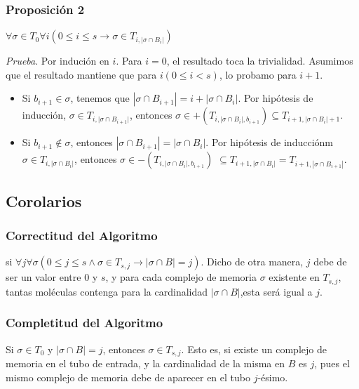 \documentclass[12pt, letterpaper, twoside]{article}
\begin{document}
    \subsubsection{Proposición 2}
    $\forall\sigma\in{T_0}\forall{i}(0\leq{i}\leq{s}\rightarrow\sigma\in{T_{i,|\sigma\cap{B_i}|}})$


    \emph{Prueba}. Por indución en $i$. Para $i=0$, el resultado toca la trivialidad. Asumimos que el resultado mantiene que para $i(0\leq{i}<s)$, lo probamo para $i+1$.
    \begin{itemize}
        \item Si $b_{i+1}\in\sigma$, tenemos que $|\sigma\cap{B_{i+1}}|=i + |\sigma\cap{B_i}|$. Por hipótesis de inducción, $\sigma\in{T_{i,|\sigma\cap{B_{i+1}|}}}$, entonces $\sigma\in{+(T_{i,|\sigma\cap{B_i}|,b_{i+1}})}\subseteq{T_{i+1,|\sigma\cap{B_i}|+1}}$.
        \item Si $b_{i+1}\notin\sigma$, entonces $|\sigma\cap{B_{i+1}}|=|\sigma\cap{B_i}|$. Por hipótesis de inducciónm $\sigma\in{T_{i, |\sigma\cap{B_i}|}}$, entonces $\sigma\in{-(T_{i,|\sigma\cap{B_i}|, b_{i+1}})}$ $\subseteq{T_{i+1, |\sigma\cap{B_i}|}}=T_{i+1, |\sigma\cap{B_{i+1}}|}$.
    \end{itemize}
    \subsection{Corolarios}

    \subsubsection{Correctitud del Algoritmo}
    si $\forall{j}\forall\sigma(0\leq j \leq s \land \sigma\in T_{s,j} \rightarrow |\sigma\cap B| = j)$. Dicho de otra manera, $j$ debe de ser un valor entre $0$ y $s$, y para cada complejo de memoria $\sigma$ existente en $T_{s,j}$, tantas moléculas contenga para la cardinalidad $|\sigma\cap B|$,esta será igual a $j$. 
    \subsubsection{Completitud del Algoritmo}
    Si $\sigma\in T_0$ y $|\sigma\cap B| = j$, entonces $\sigma\in T_{s,j}$. Esto es, si existe un complejo de memoria en el tubo de entrada, y la cardinalidad de la misma en $B$ es $j$, pues el mismo complejo de memoria debe de aparecer en el tubo $j$-ésimo.


    \newpage
\end{document}
